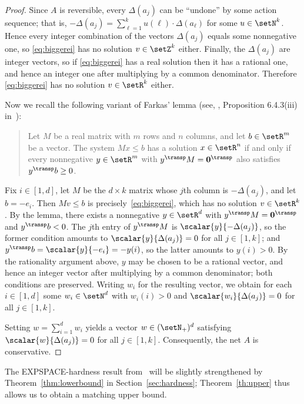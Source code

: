 \begin{proof}
Since $A$ is reversible, every $\Delta(a_j)$ can be ``undone'' by
	some action sequence; that is, $-\Delta(a_j)=\sum_{\ell=1}^k
	u(\ell)\cdot\Delta(a_\ell)$ for some $u\in\setN^k$.
Hence every integer combination of the vectors $\Delta(a_j)$ equals some
	nonnegative one, so \eqref{eq:biggerei} has no solution
	$v\in\setZ^k$ either.
	Finally, the $\Delta(a_j)$ are integer vectors, so if
	\eqref{eq:biggerei} has a real solution then it has a rational one,
	and hence an integer one after multiplying by a common denominator.
	Therefore \eqref{eq:biggerei} has no solution $v\in\setR^k$ either.

Now we recall the following variant of Farkas' lemma 
(see, \eg, Proposition 6.4.3(iii)
in~\cite{DBLP:books/daglib/0016926}):
\begin{quote}
	Let $M$ be a real matrix with $m$ rows and $n$ columns, and let
	$b \in \setR^m$ be a vector.
	The system $Mx \leq b$ has a solution $x \in \setR^n$ if and only if
	every nonnegative $y \in \setR^m$ with $y^{\transp} M =
	\mathbf{0}^{\transp}$ also satisfies $y^{\transp} b \geq 0$.
\end{quote}
Fix $i\in[1,d]$, let $M$ be the $d\times k$ matrix whose $j$th column
is $-\Delta(a_j)$, and let $b=-e_i$.  Then $Mv\leq b$ is
precisely~\eqref{eq:biggerei}, which has no solution $v\in\setR^k$.
By the lemma, there exists a nonnegative
$y\in\setR^d$ with $y^{\transp}M=\mathbf{0}^{\transp}$ and
$y^{\transp}b<0$.  The $j$th entry of $y^{\transp}M$ is
$\scalar{y}{-\Delta(a_j)}$, so the former condition amounts to
$\scalar{y}{\Delta(a_j)}=0$ for all $j\in[1,k]$; and
$y^{\transp}b=\scalar{y}{-e_i}=-y(i)$, so the latter amounts to
$y(i)>0$.
By the rationality argument above, $y$ may be chosen to be a rational
vector, and hence an integer vector after multiplying by a common
denominator; both conditions are preserved.
Writing $w_i$ for the resulting vector, we
obtain for each $i\in[1,d]$ some $w_i\in\setN^d$ with $w_i(i)>0$ and
$\scalar{w_i}{\Delta(a_j)}=0$ for all $j\in[1,k]$.

	Setting $w=\sum_{i=1}^d w_i$ yields a vector $w\in(\setN_+)^d$
	satisfying $\scalar{w}{\Delta(a_j)}=0$ for all $j\in[1,k]$.
	Consequently, the net $A$ is conservative.
\end{proof}


\noindent
The EXPSPACE-hardness result  
from~\cite{DBLP:journals/acta/JancarP19} will be slightly
strengthened by Theorem~\ref{thm:lowerbound} in
Section~\ref{sec:hardness}; Theorem~\ref{th:upper} thus allows us to
obtain a matching
upper bound.


